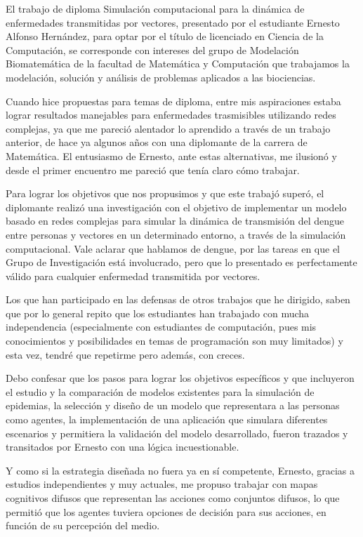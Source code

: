 \begin{opinion}
    El trabajo de diploma Simulación computacional para la dinámica de enfermedades transmitidas por vectores, presentado por el estudiante Ernesto Alfonso Hernández, para optar por el título de licenciado en Ciencia de la Computación, se corresponde con intereses del grupo de Modelación Biomatemática de la facultad de Matemática y Computación que trabajamos la modelación, solución y análisis de problemas aplicados a las biociencias.

Cuando hice propuestas para temas de diploma, entre mis aspiraciones estaba lograr resultados manejables para enfermedades trasmisibles utilizando redes complejas, ya que me pareció alentador lo aprendido a través de un trabajo anterior, de hace ya algunos años con una diplomante de la carrera de Matemática. El entusiasmo de Ernesto, ante estas alternativas, me ilusionó y desde el primer encuentro me pareció que tenía claro cómo trabajar.

Para lograr los objetivos que nos propusimos y que este trabajó superó, el diplomante realizó una investigación con el objetivo de implementar un modelo basado en redes complejas para simular la dinámica de transmisión del dengue entre personas y vectores en un determinado entorno, a través de la simulación computacional. Vale aclarar que hablamos de dengue, por las tareas en que el Grupo de Investigación está involucrado, pero que lo presentado es perfectamente válido para cualquier enfermedad transmitida por vectores.

Los que han participado en las defensas de otros trabajos que he dirigido, saben que por lo general repito que los estudiantes han trabajado con mucha independencia (especialmente con estudiantes de computación, pues mis conocimientos y posibilidades en temas de programación son muy limitados) y esta vez, tendré que repetirme pero además, con creces. 

Debo confesar que los pasos para lograr los objetivos específicos y que incluyeron el estudio y la comparación de modelos existentes para la simulación de epidemias, la selección y diseño de un modelo que representara a las personas como agentes, la implementación de una aplicación que simulara diferentes escenarios y permitiera la validación del modelo desarrollado, fueron trazados y transitados por Ernesto con una lógica incuestionable.

Y como si la estrategia diseñada no fuera ya en sí competente, Ernesto, gracias a estudios independientes y muy actuales, me propuso trabajar con mapas cognitivos difusos que representan las acciones como conjuntos difusos, lo que permitió que los agentes tuviera opciones de decisión para sus acciones, en función de su percepción del medio.


\end{opinion}
